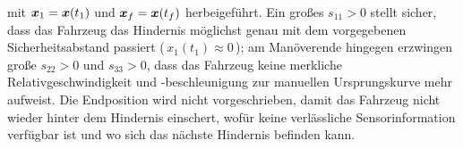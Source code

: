 mit $\boldsymbol{x}_1 = \boldsymbol{x}(t_1)$ und $\boldsymbol{x}_f = \boldsymbol{x}(t_f)$ herbeigeführt. Ein großes $s_{11}>0$ stellt sicher, dass das Fahrzeug das Hindernis möglichst genau mit dem vorgegebenen Sicherheitsabstand passiert (\,$x_1(t_1) \approx 0$\,); am Manöverende hingegen erzwingen große $s_{22}>0$ und $s_{33}>0$, dass das Fahrzeug keine merkliche Relativgeschwindigkeit und -beschleunigung zur manuellen Ursprungskurve mehr aufweist. Die Endposition wird nicht vorgeschrieben, damit das Fahrzeug nicht wieder hinter dem Hindernis einschert, wofür keine verlässliche Sensorinformation verfügbar ist und wo sich das nächste Hindernis befinden kann.


%





